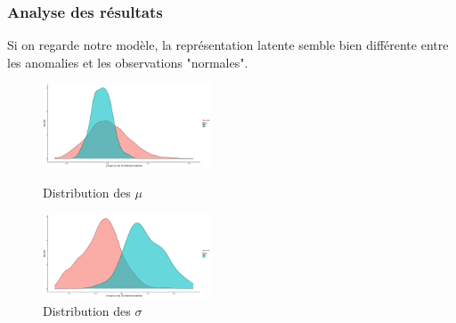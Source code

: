 \documentclass{beamer}
\begin{document}
	\begin{frame}
		\frametitle{Analyse des résultats}
		
		Si on regarde notre modèle, la représentation latente semble bien différente entre les anomalies et les observations "normales".
		
		\vspace{0.5cm}
		
		\begin{figure}
			\centering
			\begin{minipage}{.45\textwidth}
				\includegraphics[width=5cm]{../rapports/images/latent_stats/plot_mu}
				\caption{Distribution des $\mu$}
			\end{minipage}\hfill
			\begin{minipage}{.45\textwidth}
				\includegraphics[width=5cm]{../rapports/images/latent_stats/plot_sigma}
				\caption{Distribution des $\sigma$}
			\end{minipage}
		\end{figure}
		
	\end{frame}
\end{document}
